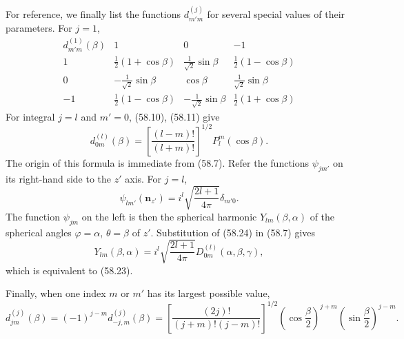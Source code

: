 For reference, we finally list the functions $d^{(j)}_{m'm}$ for several special values of their parameters. For $j=1$,
\begin{equation}
\begin{array}{c|ccc}
 d^{(1)}_{m'm}(\beta)&1&0&-1\\ \hline
 1&\frac12(1+\cos\beta)&\frac1{\sqrt2}\sin\beta&\frac12(1-\cos\beta)\\
 0&-\frac1{\sqrt2}\sin\beta&\cos\beta&\frac1{\sqrt2}\sin\beta\\
 -1&\frac12(1-\cos\beta)&-\frac1{\sqrt2}\sin\beta&\frac12(1+\cos\beta)
\end{array}
\tag{58.22}
\end{equation}
For integral $j=l$ and $m'=0$, (58.10), (58.11) give
\begin{equation}
 d^{(l)}_{0m}(\beta)=\left[\frac{(l-m)!}{(l+m)!}\right]^{1/2}P_l^m(\cos\beta).
 \tag{58.23}
\end{equation}
The origin of this formula is immediate from (58.7). Refer the functions $\psi_{jm'}$ on its right-hand side to the $z'$ axis. For $j=l$,
\begin{equation}
 \psi_{lm'}(\mathbf n_{z'})=i^l\sqrt{\frac{2l+1}{4\pi}}\delta_{m'0}.
 \tag{58.24}
\end{equation}
The function $\psi_{jm}$ on the left is then the spherical harmonic $Y_{lm}(\beta,\alpha)$ of the spherical angles $\varphi=\alpha$, $\theta=\beta$ of $z'$. Substitution of (58.24) in (58.7) gives
\begin{equation}
 Y_{lm}(\beta,\alpha)=i^l\sqrt{\frac{2l+1}{4\pi}}D^{(l)}_{0m}(\alpha,\beta,\gamma),
 \tag{58.25}
\end{equation}
which is equivalent to (58.23).

Finally, when one index $m$ or $m'$ has its largest possible value,
\begin{equation}
 d^{(j)}_{jm}(\beta)=(-1)^{j-m}d^{(j)}_{-j,m}(\beta)
 =\left[\frac{(2j)!}{(j+m)!(j-m)!}\right]^{1/2}
 \left(\cos\frac\beta2\right)^{j+m}
 \left(\sin\frac\beta2\right)^{j-m}.
 \tag{58.26}
\end{equation}

